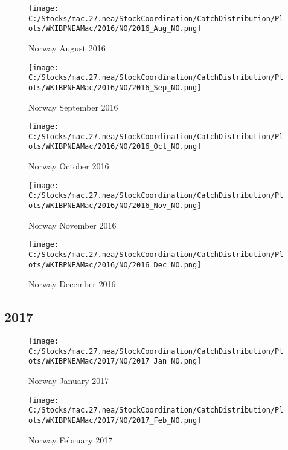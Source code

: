 \documentclass{article}
\begin{document}
\begin{figure}
	\centering
		\texttt{[image: C:/Stocks/mac.27.nea/StockCoordination/CatchDistribution/Plots/WKIBPNEAMac/2016/NO/2016\_Aug\_NO.png]}
	\caption{Norway August 2016}
	\label{fig:2016_Aug_NO}
\end{figure}

\begin{figure}
	\centering
		\texttt{[image: C:/Stocks/mac.27.nea/StockCoordination/CatchDistribution/Plots/WKIBPNEAMac/2016/NO/2016\_Sep\_NO.png]}
	\caption{Norway September 2016}
	\label{fig:2016_Sep_NO}
\end{figure}

\begin{figure}
	\centering
		\texttt{[image: C:/Stocks/mac.27.nea/StockCoordination/CatchDistribution/Plots/WKIBPNEAMac/2016/NO/2016\_Oct\_NO.png]}
	\caption{Norway October 2016}
	\label{fig:2016_Oct_NO}
\end{figure}

\begin{figure}
	\centering
		\texttt{[image: C:/Stocks/mac.27.nea/StockCoordination/CatchDistribution/Plots/WKIBPNEAMac/2016/NO/2016\_Nov\_NO.png]}
	\caption{Norway November 2016}
	\label{fig:2016_Nov_NO}
\end{figure}

\begin{figure}
	\centering
		\texttt{[image: C:/Stocks/mac.27.nea/StockCoordination/CatchDistribution/Plots/WKIBPNEAMac/2016/NO/2016\_Dec\_NO.png]}
	\caption{Norway December 2016}
	\label{fig:2016_Dec_NO}
\end{figure}


\clearpage

\newpage

\subsection{2017}



\begin{figure}[h]
	\centering
		\texttt{[image: C:/Stocks/mac.27.nea/StockCoordination/CatchDistribution/Plots/WKIBPNEAMac/2017/NO/2017\_Jan\_NO.png]}
	\caption{Norway January 2017}
	\label{fig:2017_Jan_NO}
\end{figure}

\begin{figure}
	\centering
		\texttt{[image: C:/Stocks/mac.27.nea/StockCoordination/CatchDistribution/Plots/WKIBPNEAMac/2017/NO/2017\_Feb\_NO.png]}
	\caption{Norway February 2017}
	\label{fig:2017_Feb_NO}
\end{figure}
\end{document}
